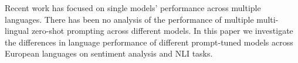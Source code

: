 Recent work has focused on single models' performance across multiple languages.
There has been no analysis of the performance of multiple
multi-lingual zero-shot prompting across different models.
In this paper we investigate the differences in language performance of different
prompt-tuned models across
European languages on sentiment analysis and 
NLI
tasks.
